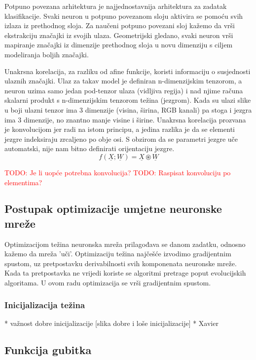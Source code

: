 \documentclass[times, utf8, diplomski]{fer}
\def\mat#1{\underline{#1}}
\def\TODO#1{\noindent\textcolor{red}{TODO: #1}\newline}
\begin{document}
Potpuno povezana arhitektura je najjednostavnija arhitektura za zadatak klasifikacije. Svaki neuron u potpuno povezanom sloju aktivira se pomoću svih izlaza iz prethodnog sloja. Za naučeni potpuno povezani sloj kažemo da vrši ekstrakciju značajki iz svojih ulaza. Geometrijski gledano, svaki neuron vrši mapiranje značajki iz dimenzije prethodnog sloja u novu dimenziju s ciljem modeliranja boljih značajki.

Unakrsna korelacija, za razliku od afine funkcije, koristi informaciju o susjednosti ulaznih značajki. Ulaz za takav model je definiran n-dimenzijskim tenzorom, a neuron uzima samo jedan pod-tenzor ulaza (vidljiva regija) i nad njime računa skalarni produkt s n-dimenzijskim tenzorom težina (jezgrom). Kada su ulazi slike u boji ulazni tenzor ima 3 dimenzije (visina, širina, RGB kanali) pa stoga i jezgra ima 3 dimenzije, no znantno manje visine i širine. Unakrsna korelacija prozvana je konvolucijom jer radi na istom principu, a jedina razlika je da se elementi jezgre indeksiraju zrcaljeno po obje osi. S obzirom da se parametri jezgre uče automatski, nije nam bitno definirati orijentaciju jezgre.
\begin{equation}
f(\mat{X};\mat{W})=\mat{X} \circledast \mat{W}
\end{equation}

\TODO{Je li uopće potrebna konvolucija?}
\TODO{Raspisat konvoluciju po elementima?}

\subsection{Postupak optimizacije umjetne neuronske mreže}
Optimizacijom težina neuronska mreža prilagođava se danom zadatku, odnosno kažemo da mreža 'uči'. Optimizaciju težina najčešće izvodimo gradijentnim spustom, uz pretpostavku derivabilnosti svih komponenata neuronske mreže. Kada ta pretpostavka ne vrijedi koriste se algoritmi pretrage poput evolucijskih algoritama. U ovom radu optimizacija se vrši gradijentnim spustom.

\subsubsection{Inicijalizacija težina}
* važnost dobre inicijalizacije
[slika dobre i loše inicijalizacije]
* Xavier

\subsection{Funkcija gubitka}
\end{document}
